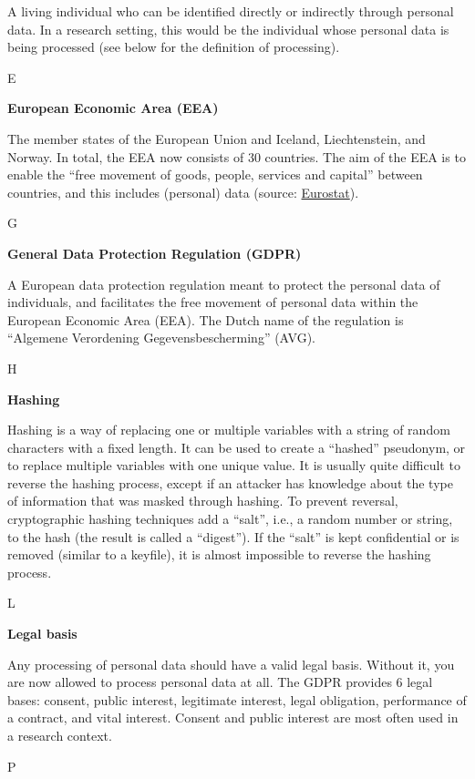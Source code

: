 \documentclass[
]{book}
\begin{document}
A living individual who can be identified directly or indirectly through personal data. In a research setting, this would be the individual whose personal data is being processed (see below for the definition of processing).

E

\textbf{European Economic Area (EEA)}

The member states of the European Union and Iceland, Liechtenstein, and Norway. In total, the EEA now consists of 30 countries. The aim of the EEA is to enable the ``free movement of goods, people, services and capital'' between countries, and this includes (personal) data (source: \href{https://ec.europa.eu/eurostat/statistics-explained/index.php?title=Glossary:European_Economic_Area_(EEA)}{Eurostat}).

G

\textbf{General Data Protection Regulation (GDPR)}

A European data protection regulation meant to protect the personal data of individuals, and facilitates the free movement of personal data within the European Economic Area (EEA). The Dutch name of the regulation is ``Algemene Verordening Gegevensbescherming'' (AVG).

H

\textbf{Hashing}

Hashing is a way of replacing one or multiple variables with a string of random characters with a fixed length. It can be used to create a ``hashed'' pseudonym, or to replace multiple variables with one unique value. It is usually quite difficult to reverse the hashing process, except if an attacker has knowledge about the type of information that was masked through hashing. To prevent reversal, cryptographic hashing techniques add a ``salt'', i.e., a random number or string, to the hash (the result is called a ``digest''). If the ``salt'' is kept confidential or is removed (similar to a keyfile), it is almost impossible to reverse the hashing process.

L

\textbf{Legal basis}

Any processing of personal data should have a valid legal basis. Without it, you are now allowed to process personal data at all. The GDPR provides 6 legal bases: consent, public interest, legitimate interest, legal obligation, performance of a contract, and vital interest. Consent and public interest are most often used in a research context.

P
\end{document}

